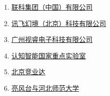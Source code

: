 \begin{enumerate}
    \item \href{https://www.clustertech.com/zh-hans/%E4%BA%BA%E5%B7%A5%E6%99%BA%E8%83%BD%E5%92%8C%E5%88%86%E6%9E%90/AILab}{联科集团（中国）有限公司}
    \item \href{http://www.xunfeivr.com/NewsStd_544.html}{讯飞幻境（北京）科技有限公司}
    \item \href{https://www.seewo.com/}{广州视睿电子科技有限公司}
    \item \href{https://cogskl.iflytek.com/%e4%bb%a3%e8%a1%a8%e6%80%a7%e6%88%90%e6%9e%9c}{认知智能国家重点实验室}
    \item \href{http://www.jyd.com.cn/zhjs1.html}{北京竞业达}
    \item \href{https://www.hiscene.com/client-case/77}{亮风台与河北师范大学}
\end{enumerate}
